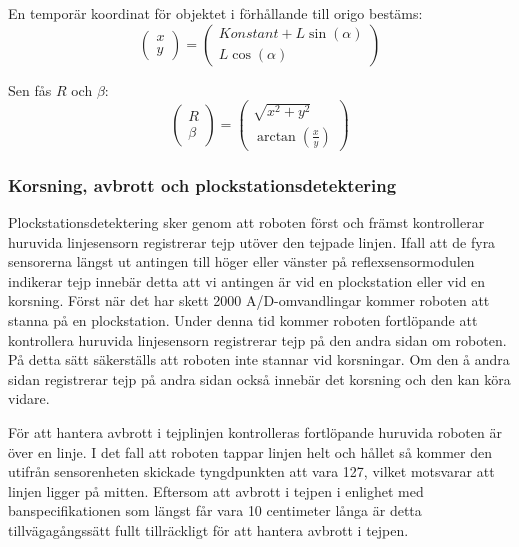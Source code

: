 En temporär koordinat för objektet i förhållande till origo bestäms:
$$\begin{pmatrix}
x \\ y
\end{pmatrix}
 = 
\begin{pmatrix}
Konstant+L \sin(\alpha) \\ 
L \cos(\alpha)
\end{pmatrix}$$

Sen fås $R$ och $\beta$:
$$\begin{pmatrix}
R \\ \beta
\end{pmatrix}
 = 
\begin{pmatrix}
\sqrt{x^2 + y^2} \\ 
\arctan(\frac{x}{y})
\end{pmatrix}$$

\subsubsection{Korsning, avbrott och plockstationsdetektering}

Plockstationsdetektering sker genom att roboten först och främst kontrollerar huruvida linjesensorn registrerar tejp utöver den tejpade linjen. Ifall att de fyra sensorerna längst ut antingen till höger eller vänster på reflexsensormodulen indikerar tejp innebär detta att vi antingen är vid en plockstation eller vid en korsning. Först när det har skett 2000 A/D-omvandlingar kommer roboten att stanna på en plockstation. Under denna tid kommer roboten fortlöpande att kontrollera huruvida linjesensorn registrerar tejp på den andra sidan om roboten. På detta sätt säkerställs att roboten inte stannar vid korsningar. Om den å andra sidan registrerar tejp på andra sidan också innebär det korsning och den kan köra vidare. 

För att hantera avbrott i tejplinjen kontrolleras fortlöpande huruvida roboten är över en linje. I det fall att roboten tappar linjen helt och hållet så kommer den utifrån sensorenheten skickade tyngdpunkten att vara 127, vilket motsvarar att linjen ligger på mitten. Eftersom att avbrott i tejpen i enlighet med banspecifikationen som längst får vara 10 centimeter långa är detta tillvägagångssätt fullt tillräckligt för att hantera avbrott i tejpen.
 


